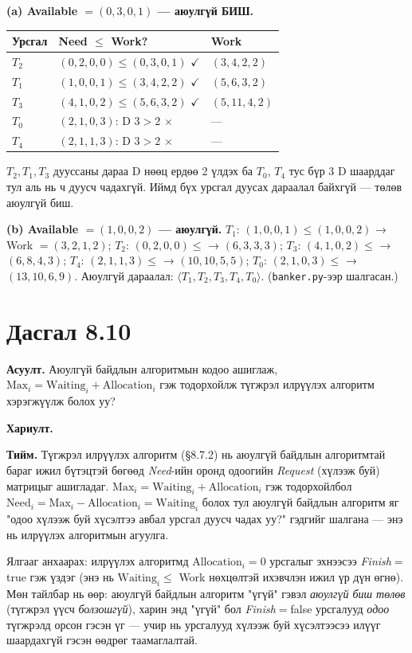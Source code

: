 \documentclass[12pt,a4paper]{article}
\newcommand{\question}[2]{\section{Дасгал #1}\textbf{Асуулт.} #2\par\medskip\textbf{Хариулт.}\par}
\begin{document}
\textbf{(a) Available $=(0,3,0,1)$ — аюулгүй БИШ.}
\begin{center}
\begin{tabular}{lll}
\toprule
Урсгал & Need $\le$ Work? & Work\\
\midrule
$T_2$ & $(0,2,0,0) \le (0,3,0,1)$ $\checkmark$ & $(3,4,2,2)$\\
$T_1$ & $(1,0,0,1) \le (3,4,2,2)$ $\checkmark$ & $(5,6,3,2)$\\
$T_3$ & $(4,1,0,2) \le (5,6,3,2)$ $\checkmark$ & $(5,11,4,2)$\\
$T_0$ & $(2,1,0,3)$: D $3 > 2$ $\times$ & —\\
$T_4$ & $(2,1,1,3)$: D $3 > 2$ $\times$ & —\\
\bottomrule
\end{tabular}
\end{center}
$T_2, T_1, T_3$ дууссаны дараа D нөөц ердөө 2 үлдэх ба $T_0$, $T_4$ тус бүр 3 D шаарддаг тул аль нь ч дуусч чадахгүй. Иймд бүх урсгал дуусах дараалал байхгүй — төлөв аюулгүй биш.

\textbf{(b) Available $=(1,0,0,2)$ — аюулгүй.}
$T_1$: $(1,0,0,1) \le (1,0,0,2)$ → Work $=(3,2,1,2)$;
$T_2$: $(0,2,0,0) \le$ → $(6,3,3,3)$;
$T_3$: $(4,1,0,2) \le$ → $(6,8,4,3)$;
$T_4$: $(2,1,1,3) \le$ → $(10,10,5,5)$;
$T_0$: $(2,1,0,3) \le$ → $(13,10,6,9)$.
Аюулгүй дараалал: $\langle T_1, T_2, T_3, T_4, T_0\rangle$. (\texttt{banker.py}-ээр шалгасан.)

\question{8.10}{Аюулгүй байдлын алгоритмын кодоо ашиглаж, $\text{Max}_i = \text{Waiting}_i + \text{Allocation}_i$ гэж тодорхойлж түгжрэл илрүүлэх алгоритм хэрэгжүүлж болох уу?}

\textbf{Тийм.} Түгжрэл илрүүлэх алгоритм (§8.7.2) нь аюулгүй байдлын алгоритмтай бараг ижил бүтэцтэй бөгөөд \textit{Need}-ийн оронд одоогийн \textit{Request} (хүлээж буй) матрицыг ашигладаг. $\text{Max}_i = \text{Waiting}_i + \text{Allocation}_i$ гэж тодорхойлбол $\text{Need}_i = \text{Max}_i - \text{Allocation}_i = \text{Waiting}_i$ болох тул аюулгүй байдлын алгоритм яг "одоо хүлээж буй хүсэлтээ авбал урсгал дуусч чадах уу?" гэдгийг шалгана — энэ нь илрүүлэх алгоритмын агуулга.

Ялгааг анхаарах: илрүүлэх алгоритмд $\text{Allocation}_i = 0$ урсгалыг эхнээсээ \textit{Finish}$=$true гэж үздэг (энэ нь $\text{Waiting}_i \le$ Work нөхцөлтэй ихэвчлэн ижил үр дүн өгнө). Мөн тайлбар нь өөр: аюулгүй байдлын алгоритм "үгүй" гэвэл \emph{аюулгүй биш төлөв} (түгжрэл үүсч \emph{болзошгүй}), харин энд "үгүй" бол \textit{Finish}$=$false урсгалууд \emph{одоо} түгжрэлд орсон гэсэн үг — учир нь урсгалууд хүлээж буй хүсэлтээсээ илүүг шаардахгүй гэсэн өөдрөг таамаглалтай.
\end{document}
